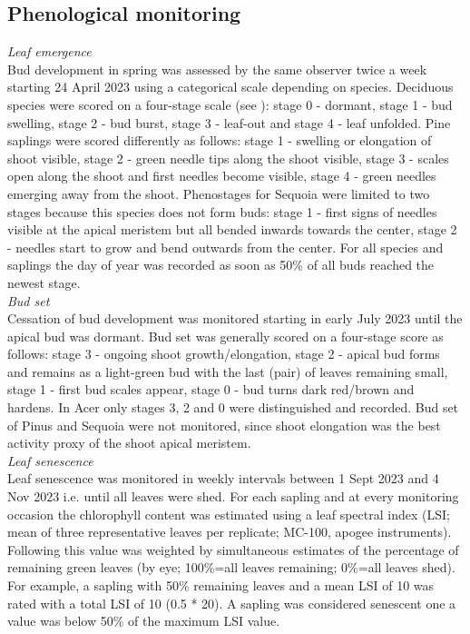 \documentclass{article}
\begin{document}
	\subsection*{Phenological monitoring}
		\textit{Leaf emergence} \\
	Bud development in spring was assessed by the same observer twice a week starting 24 April 2023 using a categorical scale depending on species. Deciduous species were scored on a four-stage scale (see \citep{vitasseElevationalAdaptationPlasticity2013a}): stage 0 - dormant, stage 1 - bud swelling, stage 2 - bud burst, stage 3 - leaf-out and stage 4 - leaf unfolded. Pine saplings were scored differently as follows: stage 1 - swelling or elongation of shoot visible, stage 2 - green needle tips along the shoot visible, stage 3 - scales open along the shoot and first needles become visible, stage 4 - green needles emerging away from the shoot. Phenostages for Sequoia were limited to two stages because this species does not form buds: stage 1 - first signs of needles visible at the apical meristem but all bended inwards towards the center, stage 2 - needles start to grow and bend outwards from the center.
	For all species and saplings the day of year was recorded as soon as 50\% of all buds reached the newest stage. \\
	
		\textit{Bud set} \\
		Cessation of bud development was monitored starting in early July 2023 until the apical bud was dormant. Bud set was generally scored on a four-stage score as follows: stage 3 - ongoing shoot growth/elongation, stage 2 - apical bud forms and remains as a light-green bud with the last (pair) of leaves remaining small, stage 1 - first bud scales appear, stage 0 - bud turns dark red/brown and hardens. In Acer only stages 3, 2 and 0 were distinguished and recorded. Bud set of Pinus and Sequoia were not monitored, since shoot elongation was the best activity proxy of the shoot apical meristem.\\
		
		\textit{Leaf senescence} \\
		Leaf senescence was monitored in weekly intervals between 1 Sept 2023 and 4 Nov 2023 i.e. until all leaves were shed. For each sapling and at every monitoring occasion the chlorophyll content was estimated using a leaf spectral index (LSI; mean of three representative leaves per replicate; MC-100, apogee instruments). Following  \citep{zohner} this value was weighted by simultaneous estimates of the percentage of remaining green leaves (by eye; 100\%=all leaves remaining; 0\%=all leaves shed). For example, a sapling with 50\% remaining leaves and a mean LSI of 10 was rated with a total LSI of 10 (0.5 * 20). A sapling was considered senescent one a value was below 50\% of the maximum LSI value. \\
		
\end{document}
